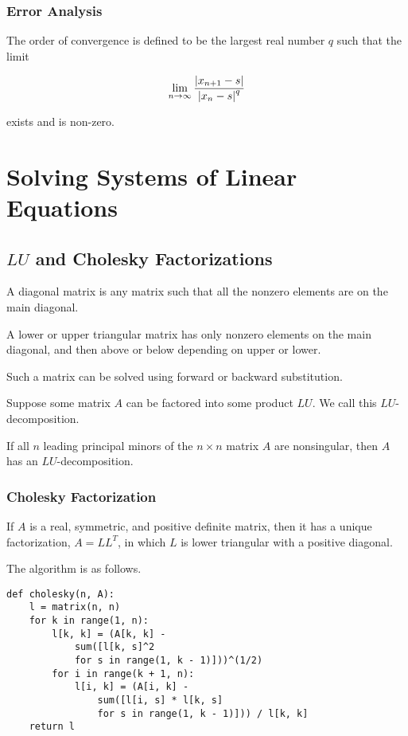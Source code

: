         \subsubsection{Error Analysis}
        The order of convergence is defined to be the largest real number $q$ such that the limit

        \[ \lim_{n \to \infty} \frac{\left\lvert x_{n + 1} - s \right\rvert}{{\left\lvert x_n - s \right\rvert}^q} \]

        exists and is non-zero.

\section{Solving Systems of Linear Equations}
    \subsection{$LU$ and Cholesky Factorizations}
    A diagonal matrix is any matrix such that all the nonzero elements are on the main diagonal.

    A lower or upper triangular matrix has only nonzero elements on the main diagonal, and then above or below depending
    on upper or lower.

    Such a matrix can be solved using forward or backward substitution.

    Suppose some matrix $A$ can be factored into some product $LU$. We call this $LU$-decomposition.

    \begin{thm}
        If all $n$ leading principal minors of the $n \times n$ matrix $A$ are nonsingular, then $A$ has an
        $LU$-decomposition.
    \end{thm}

        \subsubsection{Cholesky Factorization}
        \begin{thm}
            If $A$ is a real, symmetric, and positive definite matrix, then it has a unique factorization, $A = LL^T$,
            in which $L$ is lower triangular with a positive diagonal.
        \end{thm}

        The algorithm is as follows.

\begin{lstlisting}
def cholesky(n, A):
    l = matrix(n, n)
    for k in range(1, n):
        l[k, k] = (A[k, k] -
            sum([l[k, s]^2
            for s in range(1, k - 1)]))^(1/2)
        for i in range(k + 1, n):
            l[i, k] = (A[i, k] -
                sum([l[i, s] * l[k, s]
                for s in range(1, k - 1)])) / l[k, k]
    return l
\end{lstlisting}

